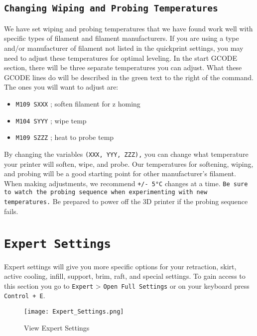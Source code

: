 \subsection{\texttt{Changing Wiping and Probing Temperatures}} \label{sssec:num1}
We have set wiping and probing temperatures that we have found work well with specific types of filament and filament manufacturers. If you are using a type and/or manufacturer of filament not listed in the quickprint settings, you may need to adjust these temperatures for optimal leveling. In the start GCODE section, there will be three separate temperatures you can adjust. What these GCODE lines do will be described in the \textcolor{green2}{green text} to the right of the command. The ones you will want to adjust are:
\begin{itemize}
\item \texttt{M109 SXXX}                    \textcolor{green2}{; soften filament for z homing}
\item \texttt{M104 SYYY}                    \textcolor{green2}{; wipe temp}
\item \texttt{M109 SZZZ}                    \textcolor{green2}{; heat to probe temp}
\end{itemize}

By changing the variables \texttt{(XXX, YYY, ZZZ),} you can change what temperature your printer will soften, wipe, and probe. Our temperatures for softening, wiping, and probing will be a good starting point for other manufacturer's filament. When making adjustments, we recommend \texttt{+/- 5°C} changes at a time. \texttt{Be sure to watch the probing sequence when experimenting with new temperatures.} Be prepared to power off the 3D printer if the probing sequence fails.

\section{\texttt{Expert Settings}}
Expert settings will give you more specific options for your retraction, skirt, active cooling, infill, support, brim, raft, and special settings. To gain access to this section you go to \texttt{Expert} > \texttt{Open Full Settings} or on your keyboard press \texttt{Control + E}.
\begin{figure}[H]
\centering
\texttt{[image: Expert\_Settings.png]}
\caption{View Expert Settings}
\label{fig:Expert Settings}
\end{figure}

